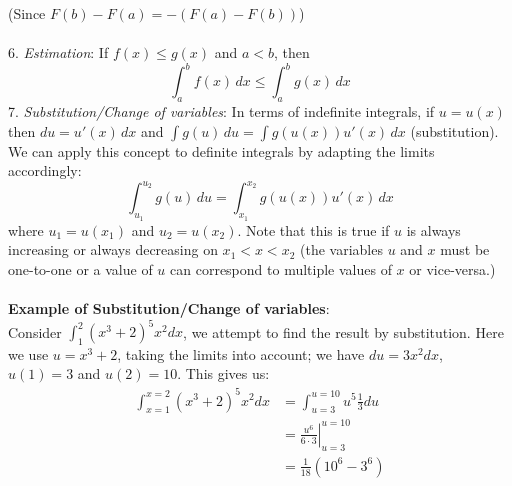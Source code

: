 \documentclass{report}
\begin{document}
(Since $F(b)-F(a)=-(F(a)-F(b))$)\\
\vspace{1mm}\\
6. \textit{Estimation}: If $f(x)\leq g(x)$ and $a<b$, then
\begin{equation*}
\int_a^bf(x)\,dx\leq\int_a^bg(x)\,dx
\end{equation*}
7. \textit{Substitution/Change of variables}: In terms of indefinite integrals,
if $u=u(x)$ then $du=u'(x)\,dx$ and 
$\int g(u)\,du=\int g(u(x))u'(x)\,dx$ (substitution).
We can apply this concept to definite integrals by adapting the limits accordingly:
\begin{equation*}
\int_{u_1}^{u_2}g(u)\,du=\int_{x_1}^{x_2}g(u(x))u'(x)\,dx
\end{equation*}
where $u_1=u(x_1)$ and $u_2=u(x_2)$. Note that this is true if $u$ is always increasing 
or always decreasing on $x_1<x<x_2$ (the variables $u$ and $x$ must be one-to-one 
or a value of $u$ can correspond to multiple values of $x$ or vice-versa.)\\
\vspace{1mm}\\
\textbf{Example of Substitution/Change of variables}:\\
Consider $\int_1^2(x^3+2)^5x^2dx$, we attempt to find the result by substitution. 
Here we use $u=x^3+2$, taking the limits into account; 
we have $du=3x^2dx$, $u(1)=3$ and $u(2)=10$. This gives us:
\begin{align*}
\int_{x=1}^{x=2}(x^3+2)^5x^2dx
&=\int_{u=3}^{u=10}u^5\frac{1}{3}du\\
&=\left.\frac{u^6}{6\cdot3}\right|_{u=3}^{u=10}\\
&=\frac{1}{18}(10^6-3^6)
\end{align*}
\newpage
\end{document}

